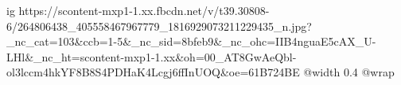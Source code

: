  
 
 
 
 

\ifcmt
  ig https://scontent-mxp1-1.xx.fbcdn.net/v/t39.30808-6/264806438_405558467967779_1816929073211229435_n.jpg?_nc_cat=103&ccb=1-5&_nc_sid=8bfeb9&_nc_ohc=IIB4nguaE5cAX_U-LHl&_nc_ht=scontent-mxp1-1.xx&oh=00_AT8GwAeQbl-ol3lccm4hkYF8B8S4PDHaK4Lcgj6ffInUOQ&oe=61B724BE
  @width 0.4
  @wrap 
\fi
